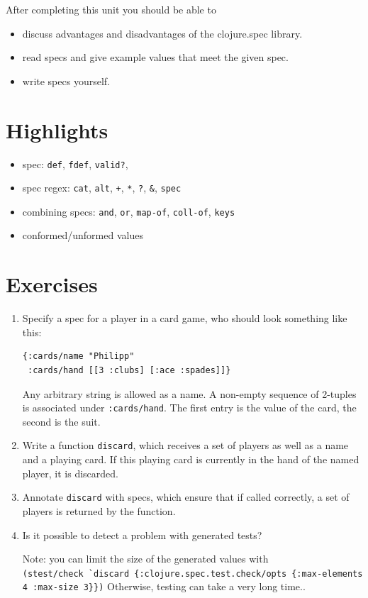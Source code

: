 \documentclass[11pt,a4paper]{article}
\begin{document}
After completing this unit you should be able to

\begin{itemize}
    \item discuss advantages and disadvantages of the clojure.spec library.
    \item read specs and give example values that meet the given spec.
    \item write specs yourself.
\end{itemize}

\section{Highlights}

\begin{itemize}
    \item spec: \verb|def|, \verb|fdef|, \verb|valid?|,
    \item spec regex: \verb|cat|, \verb|alt|, \verb|+|, \verb|*|, \verb|?|, \verb|&|, \verb|spec|
    \item combining specs: \verb|and|, \verb|or|, \verb|map-of|, \verb|coll-of|, \verb|keys|
    \item conformed/unformed values
\end{itemize}



\section{Exercises}

\begin{exercise}[Specs]
\begin{enumerate}[label=\alph*)]
\item
Specify a spec for a player in a card game,
who should look something like this:

\begin{verbatim}
{:cards/name "Philipp"
 :cards/hand [[3 :clubs] [:ace :spades]]} 
\end{verbatim}

Any arbitrary string is allowed as a name.
A non-empty sequence of 2-tuples is associated under \verb|:cards/hand|.
The first entry is the value of the card, the second is the suit.

\item
Write a function \verb|discard|,
which receives a set of players
as well as a name and a playing card.
If this playing card is currently in the hand
of the named player, it is discarded.

\item
Annotate \verb|discard| with specs, which ensure
that if called correctly, a set of players
is returned by the function.

\item
Is it possible to detect a problem with generated tests?

Note: you can limit the size of the generated values with\\
\verb|(stest/check `discard {:clojure.spec.test.check/opts {:max-elements 4 :max-size 3}})|
Otherwise, testing can take a very long time..
\end{enumerate}
\end{exercise}
\end{document}

